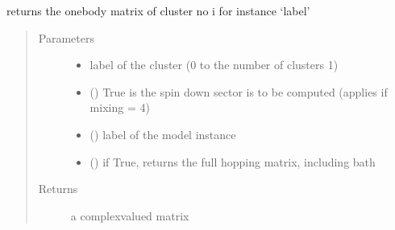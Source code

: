 \documentclass[letterpaper,10pt,english]{sphinxmanual}
\begin{document}
\begin{fulllineitems}
\label{\detokenize{functions:pyqcm.cluster_hopping_matrix}}
\sphinxAtStartPar
returns the one\sphinxhyphen{}body matrix of cluster no i for instance ‘label’
\begin{quote}\begin{description}
\item[{Parameters}] \leavevmode\begin{itemize}
\item {} 
\sphinxAtStartPar
{} \textendash{} label of the cluster (0 to the number of clusters \sphinxhyphen{} 1)

\item {} 
\sphinxAtStartPar
{} () \textendash{} True is the spin down sector is to be computed (applies if mixing = 4)

\item {} 
\sphinxAtStartPar
{} () \textendash{} label of the model instance

\item {} 
\sphinxAtStartPar
{} () \textendash{} if True, returns the full hopping matrix, including bath

\end{itemize}

\item[{Returns}] \leavevmode
\sphinxAtStartPar
a complex\sphinxhyphen{}valued matrix

\end{description}\end{quote}

\end{fulllineitems}

\end{document}
